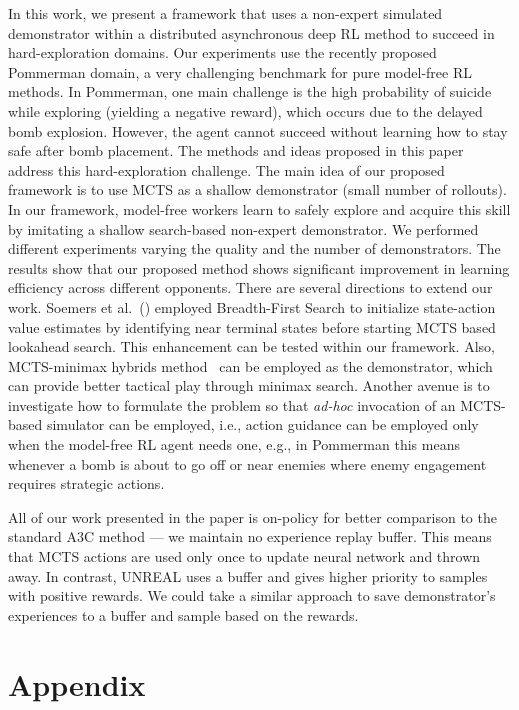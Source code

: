\documentclass[letterpaper]{article}
\begin{document}
In this work, we present a framework that uses a non-expert simulated demonstrator within a distributed asynchronous deep RL method to succeed in hard-exploration domains. Our experiments use the recently proposed Pommerman domain, a very challenging benchmark for pure model-free RL methods. In Pommerman, one main challenge is the high probability of suicide while exploring (yielding a negative reward), which occurs due to the delayed bomb explosion. However, the agent cannot succeed without learning how to stay safe after bomb placement. The methods and ideas proposed in this paper address this hard-exploration challenge. The main idea of our proposed framework is to use MCTS as a shallow demonstrator (small number of rollouts). In our framework, model-free workers learn to safely explore and acquire this skill by imitating a shallow search-based non-expert demonstrator. We performed different experiments varying the quality and the number of demonstrators. The results show that our proposed method shows significant improvement in learning efficiency across different opponents.  There are several directions to extend our work. Soemers et al.~(\citeyear{soemers2016enhancements}) employed Breadth-First Search to initialize state-action value estimates by identifying near terminal states before starting MCTS based lookahead search. This enhancement can be tested within our framework. Also, MCTS-minimax hybrids method~\cite{baier2018mcts} can be employed as the demonstrator, which can provide better tactical play through minimax search. Another avenue is to investigate how to formulate the problem so that \emph{ad-hoc} invocation of an MCTS-based simulator can be employed, i.e., action guidance can be employed only when the model-free RL agent needs one, e.g., in Pommerman this means whenever a bomb is about to go off or near enemies where enemy engagement requires strategic actions.

All of our work presented in the paper is on-policy for better comparison to the standard A3C method --- we maintain no experience replay buffer. This means that MCTS actions are used only once to update neural network and thrown away. In contrast, UNREAL uses a buffer and gives higher priority to samples with positive rewards. We could take a similar approach to save demonstrator's experiences to a buffer and sample based on the rewards.

\vspace{-1.62mm}
\section*{Appendix}
\end{document}
